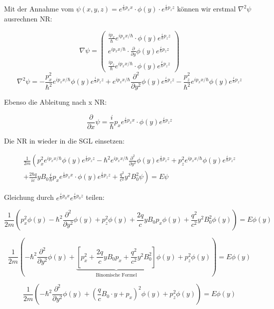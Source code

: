 Mit der Annahme vom \(\psi(x,y,z) = e^{\frac{i}{\hbar}p_xx}\cdot \phi(y)\cdot e^{\frac{i}{\hbar}p_zz}\) können wir erstmal \(\nabla^2\psi\) ausrechnen NR:

\[\nabla\psi = \begin{pmatrix} \frac{ip_x}{\hbar}e^{ip_xx/\hbar}\cdot\phi(y)e^{\frac{i}{\hbar}p_zz} \\ e^{ip_xx/\hbar}\cdot\frac{\partial}{\partial y}\phi(y)e^{\frac{i}{\hbar}p_zz}\\\frac{ip_z}{\hbar}e^{ip_xx/\hbar}\cdot\phi(y)e^{\frac{i}{\hbar}p_zz} \end{pmatrix}  \]
\[\nabla^2\psi =- \frac{p_x^2}{\hbar^2}e^{ip_xx/\hbar}\phi(y)e^{\frac{i}{\hbar}p_zz} + e^{ip_xx/\hbar}\frac{\partial^2}{\partial y^2}\phi(y)e^{\frac{i}{\hbar}p_zz}  - \frac{p_z^2}{\hbar^2}e^{ip_xx/\hbar}\phi(y)e^{\frac{i}{\hbar}p_zz}\]

Ebenso die Ableitung nach x NR:

\[\frac{\partial}{\partial x}\psi =\frac{i}{\hbar}p_x e^{\frac{i}{\hbar}p_xx}\cdot \phi(y) e^{\frac{i}{\hbar}p_zz} \]


Die NR in wieder in die SGL einsetzen:


\[\begin{split} \frac{1}{2m}\left(p_x^2e^{ip_xx/\hbar}\phi(y)e^{\frac{i}{\hbar}p_zz} -\hbar^2e^{ip_xx/\hbar}\frac{\partial^2}{\partial y^2}\phi(y)e^{\frac{i}{\hbar}p_zz} + p_z^2e^{ip_xx/\hbar}\phi(y)e^{\frac{i}{\hbar}p_zz}  \right. \\
\left.  + \frac{2 \hbar q}{ic} yB_0\frac{i}{\hbar}p_x e^{\frac{i}{\hbar}p_xx}\cdot \phi(y)e^{\frac{i}{\hbar}p_zz}  + \frac{q^2}{c^2}y^2B_0^2\psi \right) = E\psi \end{split} \]

Gleichung durch \( e^{\frac{i}{\hbar}p_0x} e^{\frac{i}{\hbar}p_0z} \) teilen:

\[ \frac{1}{2m}\left(p_x^2\phi(y) - \hbar^2 \frac{\partial^2}{\partial y^2}\phi(y) + p_z^2\phi(y) + \frac{2 q}{c} yB_0p_x  \phi(y)  + \frac{q^2}{c^2}y^2B_0^2\phi(y) \right) = E \phi(y) \]


\[  \frac{1}{2m}\left(- \hbar^2\frac{\partial^2}{\partial y^2}\phi(y) +  \underbrace{\left[p_x^2 + \frac{2 q}{c} yB_0p_x   + \frac{q^2}{c^2}y^2B_0^2\right]}_{\text{Binomische Formel}}\phi(y) + p_z^2\phi(y) \right) = E \phi(y) \]

\[  \frac{1}{2m}\left(-\hbar^2 \frac{\partial^2}{\partial y^2}\phi(y) +  (\frac{q}{c}B_0\cdot y +  p_x )^2\phi(y) + p_z^2\phi(y) \right) = E \phi(y) \]


